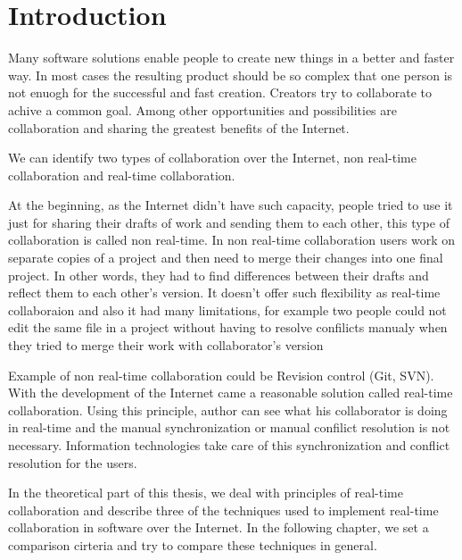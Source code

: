 \documentclass[12pt,oneside]{fithesis2}
\begin{document}
\FrontMatter
\ThesisTitlePage
\begin{ThesisDeclaration}
\DeclarationText
\AdvisorName
\end{ThesisDeclaration}
\begin{ThesisThanks}
\end{ThesisThanks}
\begin{ThesisAbstract}
\end{ThesisAbstract}
\begin{ThesisKeyWords}
\end{ThesisKeyWords}
\tableofcontents 
\MainMatter
\chapter{Introduction} 
Many software solutions enable people to create new things in a better and faster way. In most cases the resulting product should be so complex that one person is not enuogh for the successful and fast creation. Creators try to collaborate to achive a common goal. Among other opportunities and possibilities are collaboration and sharing the greatest benefits of the Internet. \par
We can identify two types of collaboration over the Internet, non real-time collaboration and real-time collaboration. 
\par At the beginning, as the Internet didn't have such capacity, people tried to use it just for sharing their drafts of work and sending them to each other, this type of collaboration is called non real-time. In non real-time collaboration users work on separate copies of a project and then need to merge their changes into one final project. In other words, they had to find differences between their drafts and reflect them to each other's version. It doesn't offer such flexibility as real-time collaboraion and also it had many limitations, for example two people could not edit the same file in a project without having to resolve confilicts manualy when they tried to merge their work with collaborator's version\par
Example of non real-time collaboration could be Revision control (Git, SVN).
With the development of the Internet came a reasonable solution called real-time collaboration. Using this principle, author can see what his collaborator is doing in real-time and the manual synchronization or manual confilict resolution is not necessary. Information technologies take care of this synchronization and conflict resolution for the users.
\par In the theoretical part of this thesis, we deal with principles of real-time collaboration and describe three of the techniques used to implement real-time collaboration in software over the Internet. In the following chapter, we set a comparison cirteria and try to compare these techniques in general. 
\end{document}
